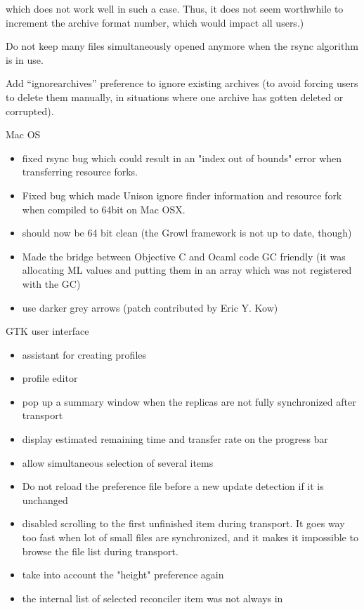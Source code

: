 \begin{changesfromversion}{2.32}
   which does not work well in such a case.  Thus, it does not
   seem worthwhile to increment the archive format number, which would
   impact all users.)
\item Do not keep many files simultaneously opened anymore when the rsync
  algorithm is in use.
\item Add ``ignorearchives'' preference to ignore existing archives (to
  avoid forcing users to delete them manually, in situations where one
  archive has gotten   deleted or corrupted).
\item Mac OS
\begin{itemize}
\item fixed rsync bug which could result in an "index out of bounds"
  error when transferring resource forks.
\item Fixed bug which made Unison ignore finder information and resource
  fork when compiled to 64bit on Mac OSX.
\item should now be 64 bit clean (the Growl framework is not up to date,
    though)
\item Made the bridge between Objective C and Ocaml code GC friendly
    (it was allocating ML values and putting them in an array which
    was not registered with the GC)
\item use darker grey arrows (patch contributed by Eric Y. Kow)
\end{itemize}
\item GTK user interface
\begin{itemize}
\item  assistant for creating profiles
\item profile editor
\item pop up a summary window when the replicas are not fully
    synchronized after transport
\item display estimated remaining time and transfer rate on the
  progress bar
\item allow simultaneous selection of several items
\item Do not reload the preference file before a new update
  detection if it is unchanged
\item disabled scrolling to the first unfinished item during transport.
  It goes way too fast when lot of small files are synchronized, and it
  makes it impossible to browse the file list during transport.
\item take into account the "height" preference again
\item the internal list of selected reconciler item was not always in

\end{itemize}
\end{changesfromversion}

